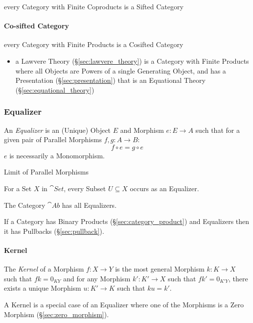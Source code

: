 every Category with Finite Coproducts is a Sifted Category



\paragraph{Co-sifted Category}\label{sec:cosifted_category}\hfill

every Category with Finite Products is a Cosifted Category

\begin{itemize}
  \item a Lawvere Theory (\S\ref{sec:lawvere_theory}) is a Category with Finite
    Products where all Objects are Powers of a single Generating Object, and has
    a Presentation (\S\ref{sec:presentation}) that is an Equational Theory
    (\S\ref{sec:equational_theory})
\end{itemize}



\subsubsection{Equalizer}\label{sec:equalizer}

An \emph{Equalizer} is an (Unique) Object $E$ and Morphism $e: E
\rightarrow A$ such that for a given pair of Parallel Morphisms $f,g :
A \rightarrow B$:
\[
  f \circ e = g \circ e
\]
$e$ is necessarily a Monomorphism.

Limit of Parallel Morphisms

For a Set $X$ in $\cat{Set}$, every Subset $U \subseteq X$ occurs
as an Equalizer.

The Category $\cat{Ab}$ has all Equalizers.

If a Category has Binary Products (\S\ref{sec:category_product}) and
Equalizers then it has Pullbacks (\S\ref{sec:pullback}).



\paragraph{Kernel}\label{sec:morphism_kernel}\hfill

The \emph{Kernel} of a Morphism $f : X \rightarrow Y$ is the most
general Morphism $k : K \rightarrow X$ such that $fk = 0_{KY}$ and for
any Morphism $k' : K' \rightarrow X$ such that $fk' = 0_{K'Y}$, there
exists a unique Morphism $u : K' \rightarrow K$ such that $ku = k'$.

A Kernel is a special case of an Equalizer where one of the Morphisms
is a Zero Morphism (\S\ref{sec:zero_morphism}).



